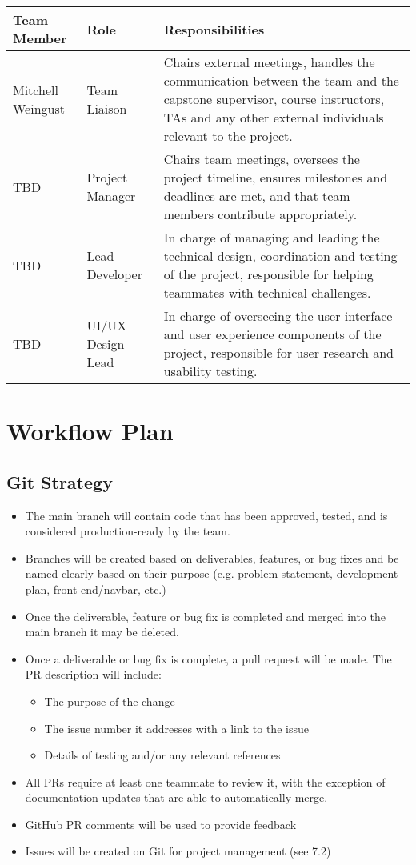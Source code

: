 \documentclass{article}
\begin{document}
\vspace{0.5cm}
\begin{tabularx}{\textwidth}{|l|l|X|}
  \hline
  \textbf{Team Member} & \textbf{Role} & \textbf{Responsibilities} \\
  \hline
  Mitchell Weingust & Team Liaison & Chairs external meetings, handles the communication between the team and the capstone 
  supervisor, course instructors, TAs and any other external individuals relevant to the project.\\
  \hline
  TBD & Project Manager & Chairs team meetings, oversees the project timeline, ensures milestones and deadlines 
  are met, and that team members contribute appropriately.\\
  \hline
  TBD & Lead Developer & In charge of managing and leading the technical design, coordination and testing of the 
  project, responsible for helping teammates with technical challenges. \\
  \hline
  TBD & UI/UX Design Lead & In charge of overseeing the user interface and user experience components of the project, 
  responsible for user research and usability testing.\\
  \hline
\end{tabularx}

\section{Workflow Plan}

\subsection{Git Strategy}
\begin{itemize}
	\item The main branch will contain code that has been approved, tested, and is considered production-ready by 
  the team.
	\item Branches will be created based on deliverables, features, or bug fixes and be named clearly based on their 
  purpose (e.g. problem-statement, development-plan, front-end/navbar, etc.) 
  \item Once the deliverable, feature or bug fix is completed and merged into the main branch it may be deleted.
	\item Once a deliverable or bug fix is complete, a pull request will be made. The PR description will include:
	\begin{itemize}
    \item The purpose of the change
    \item The issue number it addresses with a link to the issue
    \item Details of testing and/or any relevant references
  \end{itemize}
	\item All PRs require at least one teammate to review it, with the exception of documentation updates that are 
  able to automatically merge.
	\item GitHub PR comments will be used to provide feedback
	\item Issues will be created on Git for project management (see 7.2)
\end{itemize}
\end{document}
